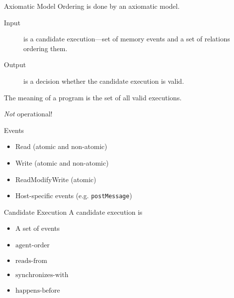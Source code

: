 \documentclass{beamer}
\begin{document}
\begin{frame}{Axiomatic Model}
  Ordering is done by an axiomatic model.

  \begin{description}
  \item[Input] is a candidate execution---set of memory events and a set of relations ordering them.
  \item[Output] is a decision whether the candidate execution is valid.
  \end{description}

  The meaning of a program is the set of all valid executions.

  \pause

  \begin{center}
    \emph{Not} operational!
  \end{center}

\end{frame}

\begin{frame}{Events}
  \begin{itemize}
  \item Read (atomic and non-atomic)
  \item Write (atomic and non-atomic)
  \item ReadModifyWrite (atomic)
  \item Host-specific events (e.g. \texttt{postMessage})
  \end{itemize}

\end{frame}

\begin{frame}{Candidate Execution}
  A candidate execution is

  \begin{itemize}
  \item A set of events
  \item $\textrm{agent-order}$
  \item $\textrm{reads-from}$
  \item $\textrm{synchronizes-with}$
  \item $\textrm{happens-before}$
  \end{itemize}
\end{frame}
\end{document}
